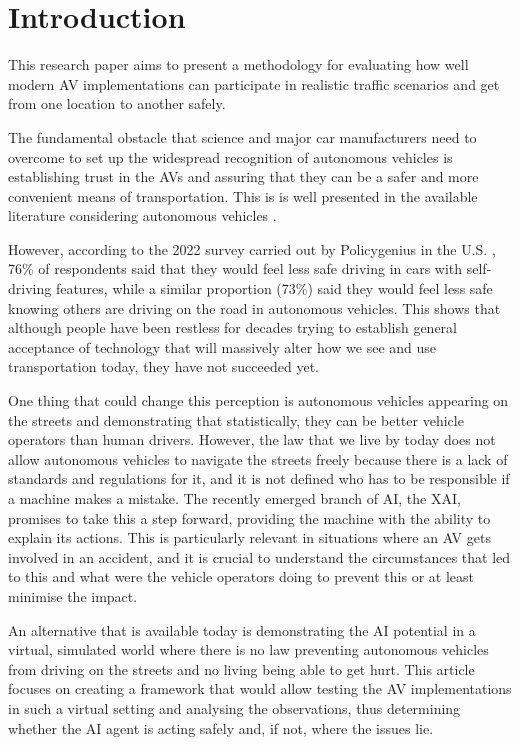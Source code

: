 \chapter{Introduction} \label{chap:one}
This research paper aims to present a methodology for evaluating how well modern AV implementations can participate in realistic traffic scenarios and get from one location to another safely.

The fundamental obstacle that science and major car manufacturers need to overcome to set up the widespread recognition of autonomous vehicles is establishing trust in the AVs and assuring that they can be a safer and more convenient means of transportation. This is is well presented in the available literature considering autonomous vehicles \cite{choi2015investigating}.

However, according to the 2022 survey carried out by Policygenius in the  U.S. \cite{policy_genius}, 76\% of respondents said that they would feel less safe driving in cars with self-driving features, while a similar proportion (73\%) said they would feel less safe knowing others are driving on the road in autonomous vehicles. This shows that although people have been restless for decades trying to establish general acceptance of technology that will massively alter how we see and use transportation today, they have not succeeded yet.

One thing that could change this perception is autonomous vehicles appearing on the streets and demonstrating that statistically, they can be better vehicle operators than human drivers. However, the law that we live by today does not allow autonomous vehicles to navigate the streets freely because there is a lack of standards and regulations for it, and it is not defined who has to be responsible if a machine makes a mistake. The recently emerged branch of AI, the XAI, promises to take this a step forward, providing the machine with the ability to explain its actions. This is particularly relevant in situations where an AV gets involved in an accident, and it is crucial to understand the circumstances that led to this and what were the vehicle operators doing to prevent this or at least minimise the impact.

An alternative that is available today is demonstrating the AI potential in a virtual, simulated world where there is no law preventing autonomous vehicles from driving on the streets and no living being able to get hurt. This article focuses on creating a framework that would allow testing the AV implementations in such a virtual setting and analysing the observations, thus determining whether the AI agent is acting safely and, if not, where the issues lie.

